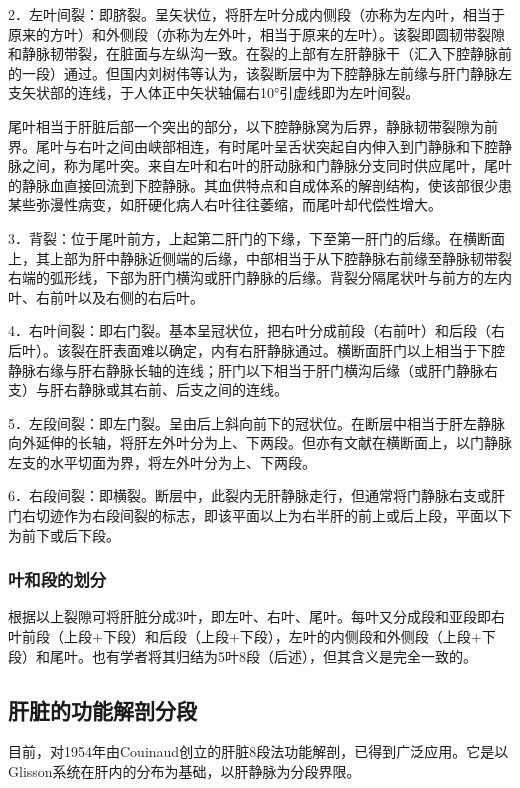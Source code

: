 2．左叶间裂：即脐裂。呈矢状位，将肝左叶分成内侧段（亦称为左内叶，相当于原来的方叶）和外侧段（亦称为左外叶，相当于原来的左叶）。该裂即圆韧带裂隙和静脉韧带裂，在脏面与左纵沟一致。在裂的上部有左肝静脉干（汇入下腔静脉前的一段）通过。但国内刘树伟等认为，该裂断层中为下腔静脉左前缘与肝门静脉左支矢状部的连线，于人体正中矢状轴偏右10°引虚线即为左叶间裂。

尾叶相当于肝脏后部一个突出的部分，以下腔静脉窝为后界，静脉韧带裂隙为前界。尾叶与右叶之间由峡部相连，有时尾叶呈舌状突起自内伸入到门静脉和下腔静脉之间，称为尾叶突。来自左叶和右叶的肝动脉和门静脉分支同时供应尾叶，尾叶的静脉血直接回流到下腔静脉。其血供特点和自成体系的解剖结构，使该部很少患某些弥漫性病变，如肝硬化病人右叶往往萎缩，而尾叶却代偿性增大。

3．背裂：位于尾叶前方，上起第二肝门的下缘，下至第一肝门的后缘。在横断面上，其上部为肝中静脉近侧端的后缘，中部相当于从下腔静脉右前缘至静脉韧带裂右端的弧形线，下部为肝门横沟或肝门静脉的后缘。背裂分隔尾状叶与前方的左内叶、右前叶以及右侧的右后叶。

4．右叶间裂：即右门裂。基本呈冠状位，把右叶分成前段（右前叶）和后段（右后叶）。该裂在肝表面难以确定，内有右肝静脉通过。横断面肝门以上相当于下腔静脉右缘与肝右静脉长轴的连线；肝门以下相当于肝门横沟后缘（或肝门静脉右支）与肝右静脉或其右前、后支之间的连线。

5．左段间裂：即左门裂。呈由后上斜向前下的冠状位。在断层中相当于肝左静脉向外延伸的长轴，将肝左外叶分为上、下两段。但亦有文献在横断面上，以门静脉左支的水平切面为界，将左外叶分为上、下两段。

6．右段间裂：即横裂。断层中，此裂内无肝静脉走行，但通常将门静脉右支或肝门右切迹作为右段间裂的标志，即该平面以上为右半肝的前上或后上段，平面以下为前下或后下段。

\subsubsection{叶和段的划分}

根据以上裂隙可将肝脏分成3叶，即左叶、右叶、尾叶。每叶又分成段和亚段即右叶前段（上段+下段）和后段（上段+下段），左叶的内侧段和外侧段（上段+下段）和尾叶。也有学者将其归结为5叶8段（后述），但其含义是完全一致的。

\subsection{肝脏的功能解剖分段}

目前，对1954年由Couinaud创立的肝脏8段法功能解剖，已得到广泛应用。它是以Glisson系统在肝内的分布为基础，以肝静脉为分段界限。

